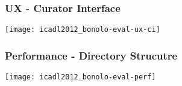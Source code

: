 \documentclass{beamer}
\begin{document}
\begin{frame}

\frametitle{UX - Curator Interface}

\begin{center}
\texttt{[image: icadl2012\_bonolo-eval-ux-ci]}
\end{center}

\end{frame}

\begin{frame}

\frametitle{Performance - Directory Strucutre}

\begin{center}
\texttt{[image: icadl2012\_bonolo-eval-perf]}
\end{center}

\end{frame}
\end{document}
